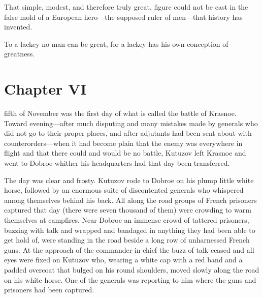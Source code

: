 That simple, modest, and therefore truly great, figure could not
be cast in the false mold of a European hero---the supposed ruler
of men---that history has invented.

To a lackey no man can be great, for a lackey has his own
conception of greatness.


\chapter*{Chapter VI}
\ifaudio 
{}
\fi

 fifth of November was the first day of what is called the
battle of Krasnoe. Toward evening---after much disputing and many
mistakes made by generals who did not go to their proper places,
and after adjutants had been sent about with counterorders---when
it had become plain that the enemy was everywhere in flight and
that there could and would be no battle, Kutuzov left Krasnoe and
went to Dobroe whither his headquarters had that day been
transferred.

The day was clear and frosty. Kutuzov rode to Dobroe on his plump
little white horse, followed by an enormous suite of discontented
generals who whispered among themselves behind his back. All
along the road groups of French prisoners captured that day
(there were seven thousand of them) were crowding to warm
themselves at campfires. Near Dobroe an immense crowd of tattered
prisoners, buzzing with talk and wrapped and bandaged in anything
they had been able to get hold of, were standing in the road
beside a long row of unharnessed French guns. At the approach of
the commander-in-chief the buzz of talk ceased and all eyes were
fixed on Kutuzov who, wearing a white cap with a red band and a
padded overcoat that bulged on his round shoulders, moved slowly
along the road on his white horse. One of the generals was
reporting to him where the guns and prisoners had been captured.

